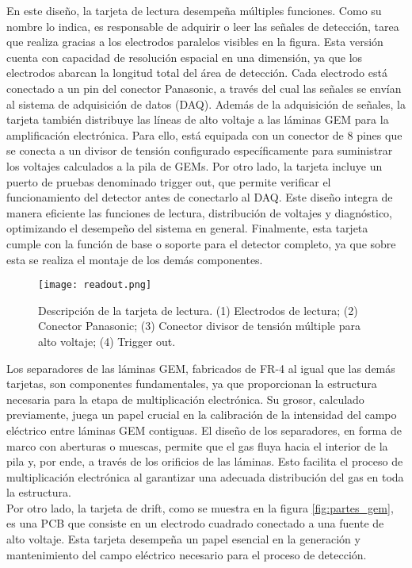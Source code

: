 \documentclass{report}
\begin{document}
\noindent En este diseño, la tarjeta de lectura desempeña múltiples funciones. Como su nombre lo indica, es responsable de adquirir o leer las señales de detección, tarea que realiza gracias a los electrodos paralelos visibles en la figura. Esta versión cuenta con capacidad de resolución espacial en una dimensión, ya que los electrodos abarcan la longitud total del área de detección. Cada electrodo está conectado a un pin del conector Panasonic, a través del cual las señales se envían al sistema de adquisición de datos (DAQ). Además de la adquisición de señales, la tarjeta también distribuye las líneas de alto voltaje a las láminas GEM para la amplificación electrónica. Para ello, está equipada con un conector de 8 pines que se conecta a un divisor de tensión configurado específicamente para suministrar los voltajes calculados a la pila de GEMs. Por otro lado, la tarjeta incluye un puerto de pruebas denominado trigger out, que permite verificar el funcionamiento del detector antes de conectarlo al DAQ. Este diseño integra de manera eficiente las funciones de lectura, distribución de voltajes y diagnóstico, optimizando el desempeño del sistema en general. Finalmente, esta tarjeta cumple con la función de base o soporte para el detector completo, ya que sobre esta se realiza el montaje de los demás componentes.\\

\begin{figure}[H]
    \centering
    \texttt{[image: readout.png]}
    \caption{Descripción de la tarjeta de lectura. (1) Electrodos de lectura; (2) Conector Panasonic; (3) Conector divisor de tensión múltiple para alto voltaje; (4) Trigger out.}
    \label{fig:readout_gem}
\end{figure}

\noindent Los separadores de las láminas GEM, fabricados de FR-4 al igual que las demás tarjetas, son componentes fundamentales, ya que proporcionan la estructura necesaria para la etapa de multiplicación electrónica. Su grosor, calculado previamente, juega un papel crucial en la calibración de la intensidad del campo eléctrico entre láminas GEM contiguas. El diseño de los separadores, en forma de marco con aberturas o muescas, permite que el gas fluya hacia el interior de la pila y, por ende, a través de los orificios de las láminas. Esto facilita el proceso de multiplicación electrónica al garantizar una adecuada distribución del gas en toda la estructura.\\ 

\noindent Por otro lado, la tarjeta de drift, como se muestra en la figura \ref{fig:partes_gem}, es una PCB que consiste en un electrodo cuadrado conectado a una fuente de alto voltaje. Esta tarjeta desempeña un papel esencial en la generación y mantenimiento del campo eléctrico necesario para el proceso de detección.\\
\end{document}
